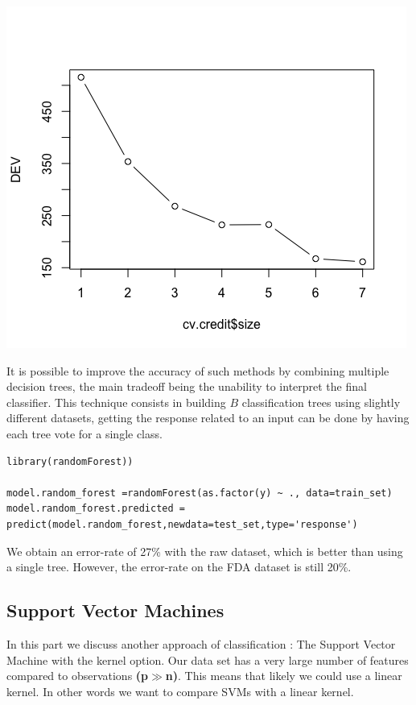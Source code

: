 \documentclass[]{report}
\begin{document}
    \begin{center}
 	\includegraphics[width=0.6\linewidth]{Figures/tree_fda_cv.png}
 	\label{fig:tree_fda_cv}
 \end{center}
 
 It is possible to improve the accuracy of such methods by combining multiple decision trees, the main tradeoff being the unability to interpret the final classifier. This technique consists in building $B$ classification trees using slightly different datasets, getting the response related to an input can be done by having each tree vote for a single class.
 
\begin{lstlisting}
library(randomForest))

model.random_forest =randomForest(as.factor(y) ~ ., data=train_set)
model.random_forest.predicted = predict(model.random_forest,newdata=test_set,type='response')
\end{lstlisting}

We obtain an error-rate of 27\% with the raw dataset, which is better than using a single tree. However, the error-rate on the FDA dataset is still 20\%.
 
\pagebreak
\subsection{Support Vector Machines}
In this part we discuss another approach of classification : The Support Vector Machine with the kernel option. Our data set has a very large number of features compared to observations \textbf{(p$\gg$n)}. This means that likely we could use a linear kernel. In other words we want to compare SVMs with a linear kernel.
\end{document}
